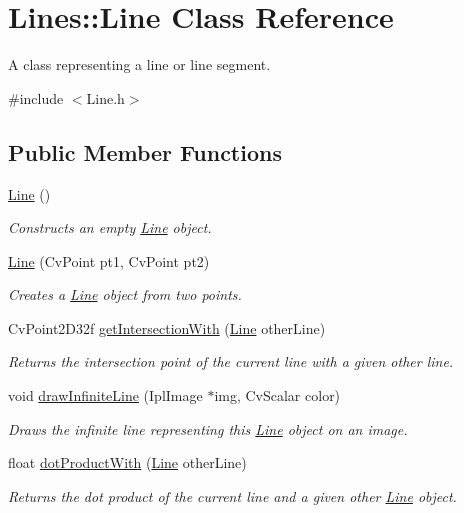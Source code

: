 \hypertarget{classLines_1_1Line}{
\section{Lines::Line Class Reference}
\label{classLines_1_1Line}
}


A class representing a line or line segment.  




{\ttfamily \#include $<$Line.h$>$}

\subsection*{Public Member Functions}
\begin{DoxyCompactItemize}
\item 
\hyperlink{classLines_1_1Line_ad5d90c9b5c2c429b0836c17ff8adcead}{Line} ()
\begin{DoxyCompactList}\small\item\em Constructs an empty \hyperlink{classLines_1_1Line}{Line} object. \item\end{DoxyCompactList}\item 
\hyperlink{classLines_1_1Line_adfb91debbc6f85acaa956f03a6ba7181}{Line} (CvPoint pt1, CvPoint pt2)
\begin{DoxyCompactList}\small\item\em Creates a \hyperlink{classLines_1_1Line}{Line} object from two points. \item\end{DoxyCompactList}\item 
CvPoint2D32f \hyperlink{classLines_1_1Line_a791086d937b2c040f290575d3a6184fc}{getIntersectionWith} (\hyperlink{classLines_1_1Line}{Line} otherLine)
\begin{DoxyCompactList}\small\item\em Returns the intersection point of the current line with a given other line. \item\end{DoxyCompactList}\item 
void \hyperlink{classLines_1_1Line_aa8d3f21dec769723995171fca1794e23}{drawInfiniteLine} (IplImage $\ast$img, CvScalar color)
\begin{DoxyCompactList}\small\item\em Draws the infinite line representing this \hyperlink{classLines_1_1Line}{Line} object on an image. \item\end{DoxyCompactList}\item 
float \hyperlink{classLines_1_1Line_ae98d61a9e9c87d7885718199a3f3ebb1}{dotProductWith} (\hyperlink{classLines_1_1Line}{Line} otherLine)
\begin{DoxyCompactList}\small\item\em Returns the dot product of the current line and a given other \hyperlink{classLines_1_1Line}{Line} object. \item\end{DoxyCompactList}\end{DoxyCompactItemize}
